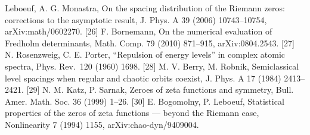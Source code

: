 \documentclass[
  10pt,
]{article}
\begin{document}
Leboeuf, A. G. Monastra, On the spacing distribution of the Riemann
zeros: corrections to the asymptotic result, J. Phys. A 39 (2006)
10743--10754, arXiv:math/0602270. {[}26{]} F. Bornemann, On the
numerical evaluation of Fredholm determinants, Math. Comp. 79 (2010)
871--915, arXiv:0804.2543. {[}27{]} N. Rosenzweig, C. E. Porter,
``Repulsion of energy levels'' in complex atomic spectra, Phys. Rev.~120
(1960) 1698. {[}28{]} M. V. Berry, M. Robnik, Semiclassical level
spacings when regular and chaotic orbits coexist, J. Phys. A 17 (1984)
2413--2421. {[}29{]} N. M. Katz, P. Sarnak, Zeroes of zeta functions and
symmetry, Bull. Amer. Math. Soc. 36 (1999) 1--26. {[}30{]} E. Bogomolny,
P. Leboeuf, Statistical properties of the zeros of zeta functions ---
beyond the Riemann case, Nonlinearity 7 (1994) 1155,
arXiv:chao-dyn/9409004.
\end{document}
